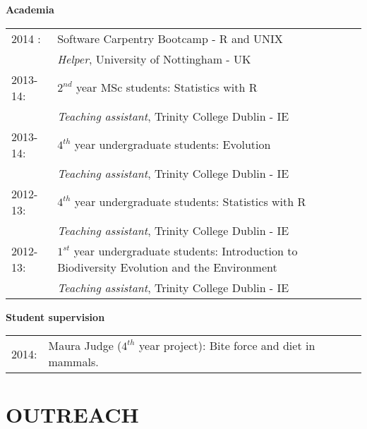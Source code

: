 \documentclass[10pt,a4paper]{article}
\begin{document}
{\raggedright\textbf{Academia}\\[1.5ex]
\begin{tabular}{ll}
2014 : & Software Carpentry Bootcamp - R and UNIX \\
& \textit{Helper}, University of Nottingham - UK \\
2013-14: & $2^{nd}$ year MSc students: Statistics with R \\
& \textit{Teaching assistant}, Trinity College Dublin - IE \\
2013-14: & $4^{th}$ year undergraduate students: Evolution\\
& \textit{Teaching assistant}, Trinity College Dublin - IE\\
2012-13: & $4^{th}$ year undergraduate students: Statistics with R\\
& \textit{Teaching assistant}, Trinity College Dublin - IE\\
2012-13: & $1^{st}$ year undergraduate students: Introduction to Biodiversity Evolution and the Environment\\
& \textit{Teaching assistant}, Trinity College Dublin - IE\\
\end{tabular}
\raggedright\textbf{Student supervision}\\[1.5ex]
\begin{tabular}{ll}
2014: & Maura Judge ($4^{th}$ year project): Bite force and diet in mammals. \\
\end{tabular}
\bigskip

\section{OUTREACH}
\bigskip

}
\end{document}
